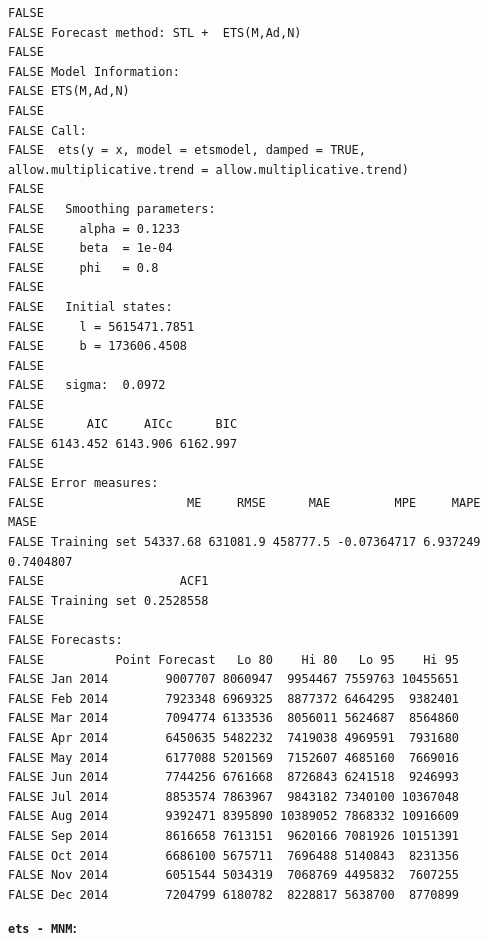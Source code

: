 \documentclass[openany]{book}
\begin{document}
\begin{verbatim}
FALSE 
FALSE Forecast method: STL +  ETS(M,Ad,N)
FALSE 
FALSE Model Information:
FALSE ETS(M,Ad,N) 
FALSE 
FALSE Call:
FALSE  ets(y = x, model = etsmodel, damped = TRUE, allow.multiplicative.trend = allow.multiplicative.trend) 
FALSE 
FALSE   Smoothing parameters:
FALSE     alpha = 0.1233 
FALSE     beta  = 1e-04 
FALSE     phi   = 0.8 
FALSE 
FALSE   Initial states:
FALSE     l = 5615471.7851 
FALSE     b = 173606.4508 
FALSE 
FALSE   sigma:  0.0972
FALSE 
FALSE      AIC     AICc      BIC 
FALSE 6143.452 6143.906 6162.997 
FALSE 
FALSE Error measures:
FALSE                    ME     RMSE      MAE         MPE     MAPE      MASE
FALSE Training set 54337.68 631081.9 458777.5 -0.07364717 6.937249 0.7404807
FALSE                   ACF1
FALSE Training set 0.2528558
FALSE 
FALSE Forecasts:
FALSE          Point Forecast   Lo 80    Hi 80   Lo 95    Hi 95
FALSE Jan 2014        9007707 8060947  9954467 7559763 10455651
FALSE Feb 2014        7923348 6969325  8877372 6464295  9382401
FALSE Mar 2014        7094774 6133536  8056011 5624687  8564860
FALSE Apr 2014        6450635 5482232  7419038 4969591  7931680
FALSE May 2014        6177088 5201569  7152607 4685160  7669016
FALSE Jun 2014        7744256 6761668  8726843 6241518  9246993
FALSE Jul 2014        8853574 7863967  9843182 7340100 10367048
FALSE Aug 2014        9392471 8395890 10389052 7868332 10916609
FALSE Sep 2014        8616658 7613151  9620166 7081926 10151391
FALSE Oct 2014        6686100 5675711  7696488 5140843  8231356
FALSE Nov 2014        6051544 5034319  7068769 4495832  7607255
FALSE Dec 2014        7204799 6180782  8228817 5638700  8770899
\end{verbatim}

\textbf{\texttt{ets\ -\ MNM}:}
\end{document}
